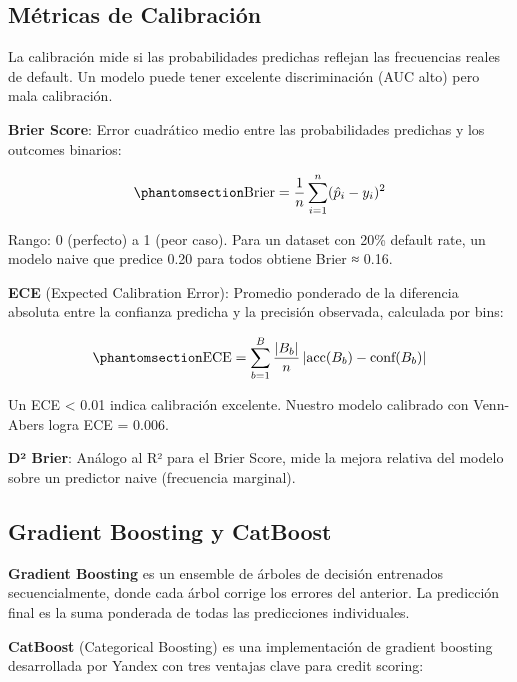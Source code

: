 \documentclass[
  spanish,
  11pt,
  letterpaper,
]{scrbook}
\theoremstyle{plain}
\theoremstyle{remark}
\begin{document}
\subsection{Métricas de
Calibración}\label{muxe9tricas-de-calibraciuxf3n}

La calibración mide si las probabilidades predichas reflejan las
frecuencias reales de default. Un modelo puede tener excelente
discriminación (AUC alto) pero mala calibración.

\textbf{Brier Score}: Error cuadrático medio entre las probabilidades
predichas y los outcomes binarios:

\begin{equation}\protect\phantomsection\label{eq-brier}{
\text{Brier} = \frac{1}{n} \sum_{i=1}^{n} (\hat{p}_i - y_i)^2
}\end{equation}

Rango: 0 (perfecto) a 1 (peor caso). Para un dataset con 20\% default
rate, un modelo naive que predice 0.20 para todos obtiene Brier ≈ 0.16.

\textbf{ECE} (Expected Calibration Error): Promedio ponderado de la
diferencia absoluta entre la confianza predicha y la precisión
observada, calculada por bins:

\begin{equation}\protect\phantomsection\label{eq-ece-foundations}{
\text{ECE} = \sum_{b=1}^{B} \frac{|B_b|}{n} \left| \text{acc}(B_b) - \text{conf}(B_b) \right|
}\end{equation}

Un ECE \textless{} 0.01 indica calibración excelente. Nuestro modelo
calibrado con Venn-Abers logra ECE = 0.006.

\textbf{D² Brier}: Análogo al R² para el Brier Score, mide la mejora
relativa del modelo sobre un predictor naive (frecuencia marginal).

\subsection{Gradient Boosting y
CatBoost}\label{gradient-boosting-y-catboost}

\textbf{Gradient Boosting} es un ensemble de árboles de decisión
entrenados secuencialmente, donde cada árbol corrige los errores del
anterior. La predicción final es la suma ponderada de todas las
predicciones individuales.

\textbf{CatBoost} (Categorical Boosting) es una implementación de
gradient boosting desarrollada por Yandex con tres ventajas clave para
credit scoring:
\end{document}
